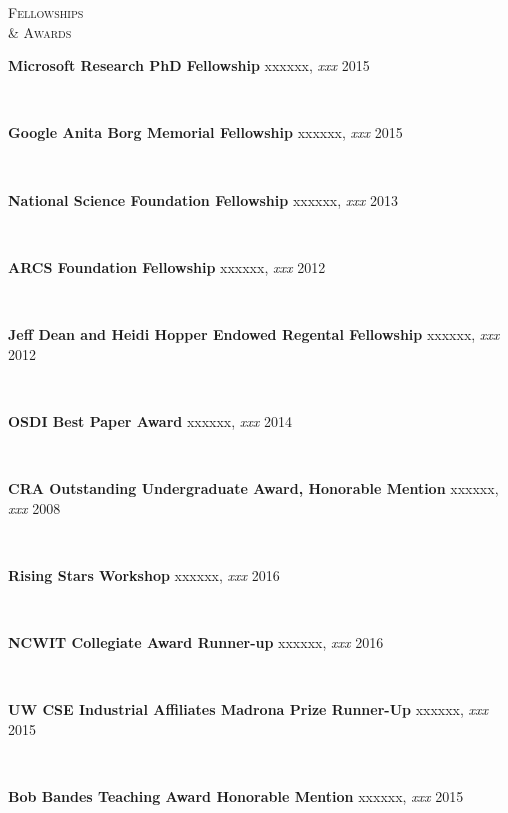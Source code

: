 \documentclass[10pt,times]{report}
\newlength{\sectiongap}
\newlength{\entrygap}
\newlength{\sectioncolwidth}
\newlength{\colgap}
\newlength{\stuffwidth}
\def\ifEqString#1#2{\def\testa{#1}\def\testb{#2}%
  \ifx\testa\testb}
\newenvironment{rtable}{
  \begin{minipage}{\textwidth}
  }{
  \end{minipage}
}
\newenvironment{rentry}[3][xxx]{
  \begin{minipage}[t]{\hsize}
    \textbf{#2}\ifEqString{#1}{xxx}\relax\else, \textit{#1}\fi
    \hspace{\stretch{1}} #3 \\
  }{
    \removelastskip
  \end{minipage}
  \\[\entrygap]  %
}
\newenvironment{rsection}[1]{
  \begin{minipage}[t]{\sectioncolwidth}
    \textsc{#1}
  \end{minipage}
  \hspace{\colgap}
  \begin{minipage}[t]{\stuffwidth}
  }{
    \removelastskip
  \end{minipage}
  \\[\sectiongap]
}
\begin{document}
\begin{rtable}
  \begin{rsection}{Fellowships\\\& Awards}
    \begin{rentry}{Microsoft Research PhD Fellowship}{2015}
      \vspace{-0.75em}
    \end{rentry} 
    \begin{rentry}{Google Anita Borg Memorial Fellowship}{2015}
      \vspace{-0.75em}
    \end{rentry} 
    \begin{rentry}{National Science Foundation Fellowship}{2013}
      \vspace{-0.75em}
    \end{rentry}
    \begin{rentry}{ARCS Foundation Fellowship}{2012}
       \vspace{-0.75em}
    \end{rentry}
    \begin{rentry}{Jeff Dean and Heidi Hopper Endowed Regental Fellowship}{2012}
       \vspace{-0.75em}
    \end{rentry}
    \begin{rentry}{OSDI Best Paper Award}{2014}
      \vspace{-0.75em}
    \end{rentry}
    \begin{rentry}{CRA Outstanding Undergraduate Award, Honorable
      Mention}{2008}
    \vspace{-0.75em}
    \end{rentry}
    \begin{rentry}{Rising Stars Workshop}{2016}
      \vspace{-0.75em}
    \end{rentry} 
    \begin{rentry}{NCWIT Collegiate Award Runner-up}{2016}
      \vspace{-0.75em}
    \end{rentry} 
    \begin{rentry}{UW CSE Industrial Affiliates Madrona Prize Runner-Up}{2015}
     \vspace{-0.75em}
    \end{rentry} 
    \begin{rentry}{Bob Bandes Teaching Award Honorable Mention}{2015}
      \vspace{-0.75em}
    \end{rentry} 

\end{rsection}
\end{rtable}
\end{document}
